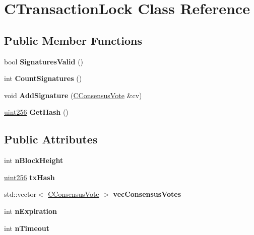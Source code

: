 \hypertarget{class_c_transaction_lock}{}\section{C\+Transaction\+Lock Class Reference}
\label{class_c_transaction_lock}
\subsection*{Public Member Functions}
\begin{DoxyCompactItemize}
\item 
\mbox{\label{class_c_transaction_lock_a71cb6705a8f0bfb4a8453d3b284e3cf7}} 
bool {\bfseries Signatures\+Valid} ()
\item 
\mbox{\label{class_c_transaction_lock_aa74b16eec6daee397785a91193fc3306}} 
int {\bfseries Count\+Signatures} ()
\item 
\mbox{\label{class_c_transaction_lock_a8f09c2c0453950fb6deadcccf5f518d7}} 
void {\bfseries Add\+Signature} (\mbox{\hyperlink{class_c_consensus_vote}{C\+Consensus\+Vote}} \&cv)
\item 
\mbox{\label{class_c_transaction_lock_a2142d2e27db93d33ac93761058f8d803}} 
\mbox{\hyperlink{classuint256}{uint256}} {\bfseries Get\+Hash} ()
\end{DoxyCompactItemize}
\subsection*{Public Attributes}
\begin{DoxyCompactItemize}
\item 
\mbox{\label{class_c_transaction_lock_a358a18da2b8b378cc7cd1dae145f611f}} 
int {\bfseries n\+Block\+Height}
\item 
\mbox{\label{class_c_transaction_lock_a9d4babccfcdf7fe3806dd3ec1b56d08a}} 
\mbox{\hyperlink{classuint256}{uint256}} {\bfseries tx\+Hash}
\item 
\mbox{\label{class_c_transaction_lock_a399f0d14a38794034c5f530599e95b3a}} 
std\+::vector$<$ \mbox{\hyperlink{class_c_consensus_vote}{C\+Consensus\+Vote}} $>$ {\bfseries vec\+Consensus\+Votes}
\item 
\mbox{\label{class_c_transaction_lock_aec15172be9c7f1cbe4b989387fdb1b52}} 
int {\bfseries n\+Expiration}
\item 
\mbox{\label{class_c_transaction_lock_a8c18d2530bfcea24bee8d5773d12c0a9}} 
int {\bfseries n\+Timeout}
\end{DoxyCompactItemize}


